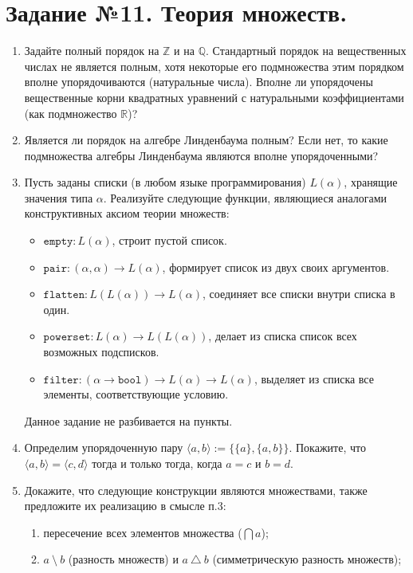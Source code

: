 \documentclass[10pt,a4paper,oneside]{article}
\begin{document}
\section*{Задание №11. Теория множеств.}
\begin{enumerate}
\item Задайте полный порядок на $\mathbb{Z}$ и на $\mathbb{Q}$. Стандартный порядок на вещественных числах не
является полным, хотя некоторые его подмножества этим порядком вполне упорядочиваются (натуральные числа).
Вполне ли упорядочены вещественные корни квадратных уравнений с натуральными коэффициентами (как подмножество $\mathbb{R}$)?
\item Является ли порядок на алгебре Линденбаума полным? Если нет, то какие подмножества алгебры Линденбаума
являются вполне упорядоченными?
\item Пусть заданы списки (в любом языке программирования) $L(\alpha)$, хранящие значения типа $\alpha$.
Реализуйте следующие функции, являющиеся аналогами конструктивных аксиом теории множеств:
\begin{itemize}
\item $\texttt{empty}: L(\alpha)$, строит пустой список.
\item $\texttt{pair}: (\alpha, \alpha) \rightarrow L(\alpha)$, формирует список из двух своих аргументов.
\item $\texttt{flatten}: L(L(\alpha)) \rightarrow L(\alpha)$, соединяет все списки внутри списка в один.
\item $\texttt{powerset}: L(\alpha) \rightarrow L(L(\alpha))$, делает из списка список всех возможных подсписков.
\item $\texttt{filter}: (\alpha \rightarrow \texttt{bool}) \rightarrow L(\alpha) \rightarrow L(\alpha)$,
выделяет из списка все элементы, соответствующие условию.
\end{itemize}
Данное задание не разбивается на пункты.
\item Определим упорядоченную пару $\langle a,b\rangle := \{\{a\},\{a,b\}\}$. Покажите, что
$\langle a,b \rangle = \langle c,d\rangle$ тогда и только тогда, когда $a = c$ и $b = d$.
\item Докажите, что следующие конструкции являются множествами, также предложите их реализацию в смысле п.3: 
\begin{enumerate}
\item пересечение всех элементов множества ($\bigcap a$);
\item $a\ \setminus\ b$ (разность множеств) и $a\ \triangle\ b$ (симметрическую разность множеств);

\end{enumerate}
\end{enumerate}
\end{document}
